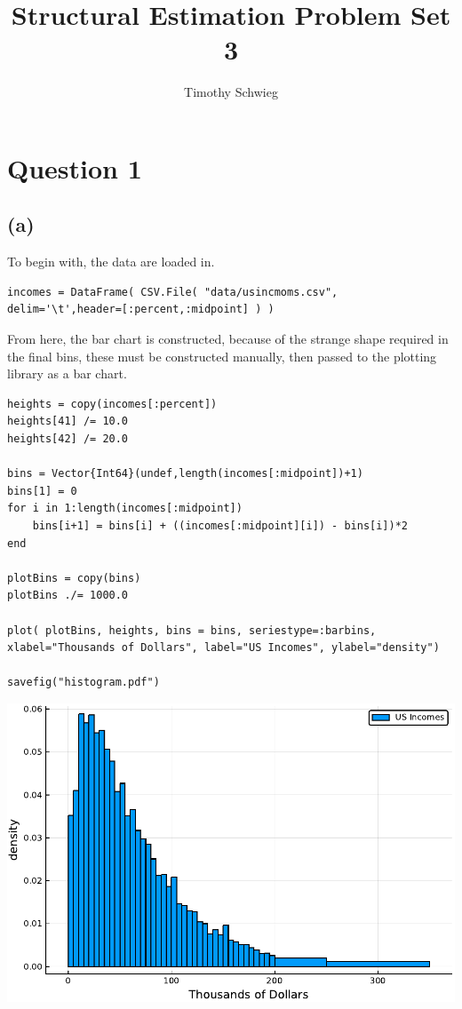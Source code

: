 \documentclass[12pt]{paper}
\title{Structural Estimation Problem Set 3}
\author{Timothy Schwieg}
\begin{document}
\maketitle

\section{Question 1}

\subsection{(a)}


To begin with, the data are loaded in.

\begin{verbatim}
incomes = DataFrame( CSV.File( "data/usincmoms.csv", delim='\t',header=[:percent,:midpoint] ) )
\end{verbatim}



From here, the bar chart is constructed, because of the strange shape
required in the final bins, these must be constructed manually, then
passed to the plotting library as a bar chart.



\begin{verbatim}
heights = copy(incomes[:percent])
heights[41] /= 10.0
heights[42] /= 20.0

bins = Vector{Int64}(undef,length(incomes[:midpoint])+1)
bins[1] = 0
for i in 1:length(incomes[:midpoint])
    bins[i+1] = bins[i] + ((incomes[:midpoint][i]) - bins[i])*2
end

plotBins = copy(bins)
plotBins ./= 1000.0

plot( plotBins, heights, bins = bins, seriestype=:barbins, xlabel="Thousands of Dollars", label="US Incomes", ylabel="density")

savefig("histogram.pdf")
\end{verbatim}

\begin{centering}
  \includegraphics{histogram.pdf}
\end{centering}
\end{document}
